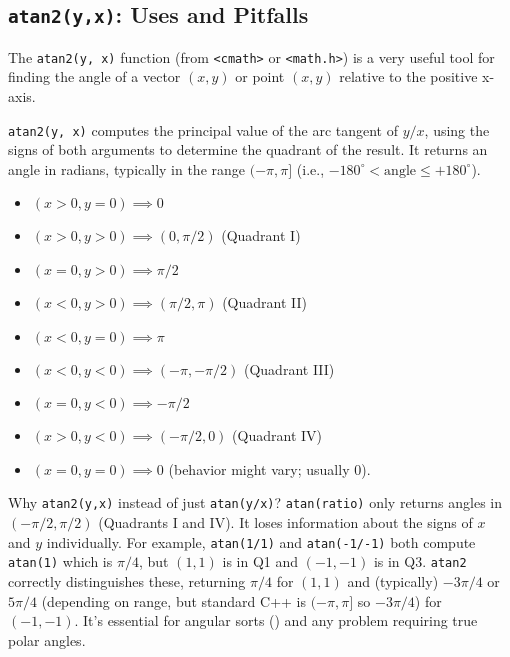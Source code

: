 \subsection{\texttt{atan2(y,x)}: Uses and Pitfalls}
\label{ssec:A.3.3}

The \texttt{atan2(y, x)} function (from \texttt{<cmath>} or \texttt{<math.h>}) is a very useful tool for finding the angle of a vector $(x,y)$ or point $(x,y)$ relative to the positive x-axis.

\begin{definition}
\label{def:A.3.3.atan2}
\texttt{atan2(y, x)} computes the principal value of the arc tangent of $y/x$, using the signs of both arguments to determine the quadrant of the result.
It returns an angle in radians, typically in the range $(-\pi, \pi]$ (i.e., $-180^\circ < \text{angle} \le +180^\circ$).
\begin{itemize}
    \item $(x>0, y=0) \implies 0$
    \item $(x>0, y>0) \implies (0, \pi/2)$ (Quadrant I)
    \item $(x=0, y>0) \implies \pi/2$
    \item $(x<0, y>0) \implies (\pi/2, \pi)$ (Quadrant II)
    \item $(x<0, y=0) \implies \pi$
    \item $(x<0, y<0) \implies (-\pi, -\pi/2)$ (Quadrant III)
    \item $(x=0, y<0) \implies -\pi/2$
    \item $(x>0, y<0) \implies (-\pi/2, 0)$ (Quadrant IV)
    \item $(x=0, y=0) \implies 0$ (behavior might vary; usually 0).
\end{itemize}
\end{definition}

\begin{intuition}
\label{intuition:A.3.3.atan2_why}
Why \texttt{atan2(y,x)} instead of just \texttt{atan(y/x)}?
\texttt{atan(ratio)} only returns angles in $(-\pi/2, \pi/2)$ (Quadrants I and IV). It loses information about the signs of $x$ and $y$ individually. For example, \texttt{atan(1/1)} and \texttt{atan(-1/-1)} both compute \texttt{atan(1)} which is $\pi/4$, but $(1,1)$ is in Q1 and $(-1,-1)$ is in Q3.
\texttt{atan2} correctly distinguishes these, returning $\pi/4$ for $(1,1)$ and (typically) $-3\pi/4$ or $5\pi/4$ (depending on range, but standard C++ is $(-\pi, \pi]$ so $-3\pi/4$) for $(-1,-1)$.
It's essential for angular sorts () and any problem requiring true polar angles.
\end{intuition}


